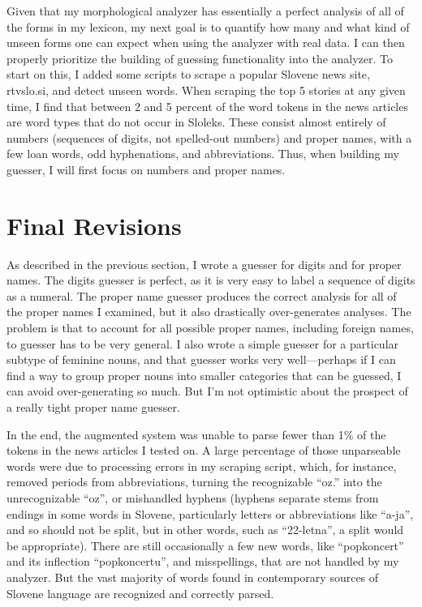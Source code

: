 \documentclass[11pt,letterpaper]{article}
\begin{document}
Given that my morphological analyzer has essentially a perfect analysis of all
of the forms in my lexicon, my next goal is to quantify how many and what kind
of unseen forms one can expect when using the analyzer with real data. I can
then properly prioritize the building of guessing functionality into the
analyzer.  To start on this, I added some scripts to scrape a popular Slovene
news site, rtvslo.si, and detect unseen words.  When scraping the top 5 stories
at any given time, I find that between 2 and 5 percent of the word tokens in
the news articles are word types that do not occur in Sloleks.  These consist
almost entirely of numbers (sequences of digits, not spelled-out numbers) and
proper names, with a few loan words, odd hyphenations, and abbreviations.
Thus, when building my guesser, I will first focus on numbers and proper names.

\section{Final Revisions}

As described in the previous section, I wrote a guesser for digits and for
proper names.  The digits guesser is perfect, as it is very easy to label a
sequence of digits as a numeral.  The proper name guesser produces the correct
analysis for all of the proper names I examined, but it also drastically
over-generates analyses.  The problem is that to account for all possible
proper names, including foreign names, to guesser has to be very general.  I
also wrote a simple guesser for a particular subtype of feminine nouns, and
that guesser works very well---perhaps if I can find a way to group proper
nouns into smaller categories that can be guessed, I can avoid over-generating
so much.  But I'm not optimistic about the prospect of a really tight proper
name guesser.

In the end, the augmented system was unable to parse fewer than 1\% of the
tokens in the news articles I tested on.  A large percentage of those
unparseable words were due to processing errors in my scraping script, which,
for instance, removed periods from abbreviations, turning the recognizable
``oz.'' into the unrecognizable ``oz'', or mishandled hyphens (hyphens separate
stems from endings in some words in Slovene, particularly letters or
abbreviations like ``a-ja'', and so should not be split, but in other words,
such as ``22-letna'', a split would be appropriate).  There are still
occasionally a few new words, like ``popkoncert'' and its inflection
``popkoncertu'', and misspellings, that are not handled by my analyzer.  But
the vast majority of words found in contemporary sources of Slovene language
are recognized and correctly parsed.
\end{document}
